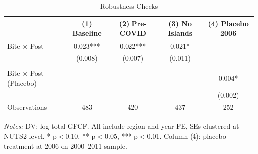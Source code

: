 \begin{table}[H]
\centering
\caption{Robustness Checks}
\label{tab:robust}
\small
\begin{threeparttable}
\begin{tabular}{lcccc}
\toprule
& (1) Baseline & (2) Pre-COVID & (3) No Islands & (4) Placebo 2006 \\
\midrule
Bite $\times$ Post & 0.023*** & 0.022*** & 0.021* & \\
& (0.008) & (0.007) & (0.011) & \\
\\
Bite $\times$ Post (Placebo) & & & & 0.004* \\
& & & & (0.002) \\
\midrule
Observations & 483 & 420 & 437 & 252 \\
\bottomrule
\end{tabular}
\begin{tablenotes}[flushleft]
\footnotesize
\item \textit{Notes:} DV: log total GFCF. All include region and year FE, SEs clustered at NUTS2 level. * p$<$0.10, ** p$<$0.05, *** p$<$0.01. Column (4): placebo treatment at 2006 on 2000--2011 sample.
\end{tablenotes}
\end{threeparttable}
\end{table}
